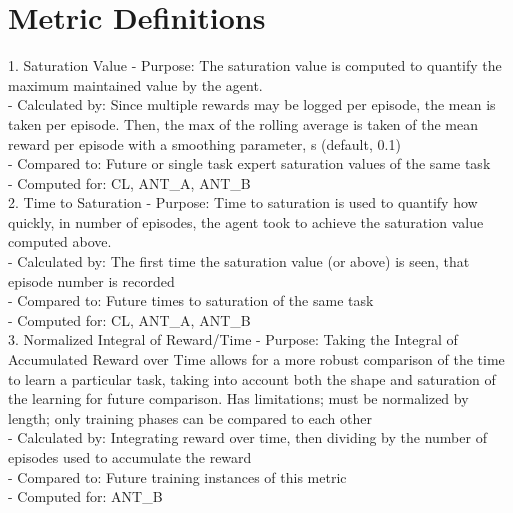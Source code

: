 \iffalse           
    Compositional skill transfer
        we see this as an instance of 3c 
            Hava mentioned this as a prime goal for L2M program.
            Concern
                How do we identify the "skill relationships" between the tasks? Do we need to do this before designing the syllabus?
            Motivation: system learns Tasks T1, T2, T3 (each having one or more "skills"). Then in T4, system has to use a combination of skills from the prior tasks.
            What this might mean in case of L2Arcade
                T1 = Pong (skills: paddle control, intercept ball, steer ball away from opposing paddle)
                T2 = Breakout (skills: paddle control, intercept ball, steer ball toward blocks)
                T3 = Freeway (skills: control ball, avoid blocks)
                T4 = PongBreakout (skills: paddle control, intercept ball, steer ball toward blocks, and away from opposing paddle)
\fi

\section{Metric Definitions}

1. Saturation Value
    - Purpose: The saturation value is computed to quantify the maximum maintained value by the agent.\\
    - Calculated by: Since multiple rewards may be logged per episode, the mean is taken per episode. Then, the max of the rolling average is taken of the mean reward per episode with a smoothing parameter, s (default, 0.1)\\
    - Compared to: Future or single task expert saturation values of the same task\\
    - Computed for: CL, ANT\_A, ANT\_B\\                   

2. Time to Saturation
    - Purpose: Time to saturation is used to quantify how quickly, in number of episodes, the agent took to achieve the saturation value computed above.\\
    - Calculated by: The first time the saturation value (or above) is seen, that episode number is recorded\\
    - Compared to: Future times to saturation of the same task\\
    - Computed for: CL, ANT\_A, ANT\_B\\

3. Normalized Integral of Reward/Time
    - Purpose: Taking the Integral of Accumulated Reward over Time allows for a more robust comparison of the time to learn a particular task, taking into account both the shape and saturation of the learning for future comparison. Has limitations; must be normalized by length; only training phases can be compared to each other \\
    - Calculated by: Integrating reward over time, then dividing by the number of episodes used to accumulate the reward\\
    - Compared to: Future training instances of this metric\\
    - Computed for: ANT\_B\\

